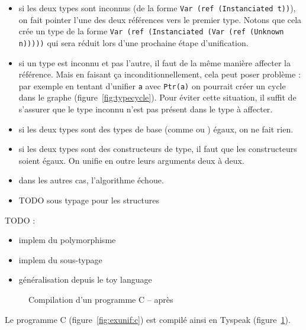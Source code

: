 \begin{itemize}

\item si les deux types sont inconnus (de la forme \texttt{Var (ref
(Instanciated t))}), on fait pointer l'une des deux références vers le premier
type. Notons que cela crée un type de la forme \texttt{Var (ref (Instanciated
(Var (ref (Unknown n)))))} qui sera réduit lors d'une prochaine étape
d'unification.

\item si un type est inconnu et pas l'autre, il faut de la même manière affecter la
référence. Mais en faisant ça inconditionnellement, cela peut poser problème :
par exemple en tentant d'unifier \texttt{a} avec \texttt{Ptr(a)} on pourrait
créer un cycle dans le graphe (figure~\ref{fig:typecycle}).
Pour éviter cette situation, il suffit de s'assurer que le type inconnu n'est
pas présent dans le type à affecter.

\item si les deux types sont des types de base (comme \tInt ou \tFloat) égaux,
on ne fait rien.

\item si les deux types sont des constructeurs de type, il faut que les
constructeurs soient égaux. On unifie en outre leurs arguments deux à deux.

\item dans les autres cas, l'algorithme échoue.

\item TODO sous typage pour les structures

\end{itemize}

TODO :

\begin{itemize}
\item implem du polymorphisme
\item implem du sous-typage
\item généralisation depuis le toy language
\end{itemize}

\clearpage

\begin{figure} %


  \caption{Compilation d'un programme C -- après}
  \label{fig:exunif:tpk}
\end{figure} %

Le programme C (figure~\ref{fig:exunif:c}) est compilé ainsi en Tyspeak
(figure~\ref{fig:exunif:tpk}).

